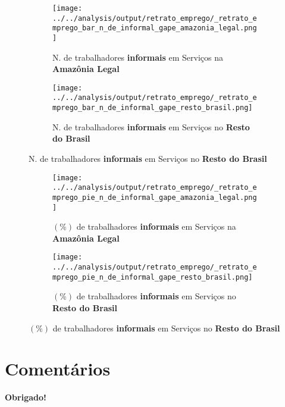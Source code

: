 \documentclass[11pt]{beamer}
\begin{document}
\begin{frame}[label=_retrato_emprego_bar_n_de_informal_gape]{}
\textit{\hyperlink{indice_principal}{}}
\begin{figure}
\centering
\begin{subfigure}{.5\textwidth}
  \centering
  \texttt{[image: ../../analysis/output/retrato\_emprego/\_retrato\_emprego\_bar\_n\_de\_informal\_gape\_amazonia\_legal.png]}
  \label{fig:_retrato_emprego_bar_n_de_informal_gape_amazonia_legal}
  \caption{{\tiny N. de trabalhadores \textbf{informais} em Serviços na \textbf{Amazônia Legal}}}
\end{subfigure}%
\begin{subfigure}{.5\textwidth}
  \centering
  \texttt{[image: ../../analysis/output/retrato\_emprego/\_retrato\_emprego\_bar\_n\_de\_informal\_gape\_resto\_brasil.png]}
  \label{fig:_retrato_emprego_bar_n_de_informal_gape_resto_brasil}
   \caption{{\tiny N. de trabalhadores \textbf{informais} em Serviços no \textbf{Resto do Brasil}}}
\end{subfigure}
\end{figure}
\end{frame}


\begin{frame}[label=_retrato_emprego_pie_n_de_informal_gape]{}
\textit{\hyperlink{indice_principal}{}}
\begin{figure}
\centering
\begin{subfigure}{.5\textwidth}
  \centering
  \texttt{[image: ../../analysis/output/retrato\_emprego/\_retrato\_emprego\_pie\_n\_de\_informal\_gape\_amazonia\_legal.png]}
  \label{fig:_retrato_emprego_pie_n_de_informal_gape_amazonia_legal}
  \caption{{\tiny $(\%)$ de trabalhadores \textbf{informais} em Serviços na \textbf{Amazônia Legal}}}
\end{subfigure}%
\begin{subfigure}{.5\textwidth}
  \centering
  \texttt{[image: ../../analysis/output/retrato\_emprego/\_retrato\_emprego\_pie\_n\_de\_informal\_gape\_resto\_brasil.png]}
  \label{fig:_retrato_emprego_pie_n_de_informal_gape_resto_brasil}
   \caption{{\tiny $(\%)$ de trabalhadores \textbf{informais} em Serviços no \textbf{Resto do Brasil}}}
\end{subfigure}
\end{figure}
\end{frame}

\section{Comentários}


\frame
{
    \begin{center}
     \vfill
    \textbf{Obrigado!}
     \\

     \begin{small}
     \end{small}
     \vfill
\end{center}
}
\end{document}

